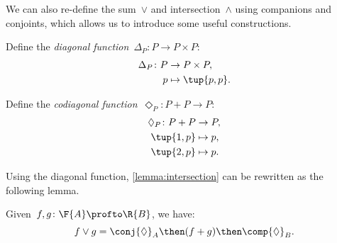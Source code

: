 We can also re-define the sum~$\vee$ and intersection~$\wedge$ using companions and conjoints, which allows us to introduce some useful constructions.

\begin{definition}
Define the \emph{diagonal function}~$\Delta_P\colon P \to P \times P$:
\begin{equation}
\begin{aligned}
    \Delta_P \colon P & \to P \times P, \\
             p & \mapsto \tup{p, p}.
\end{aligned}
\end{equation}
\end{definition}

\begin{definition}
Define the \emph{codiagonal function}~$\Diamond_P\colon P+P \to P $:
\begin{equation}
\begin{aligned}
    \Diamond_P \colon P + P & \to P,  \\
            \tup{1,p} & \mapsto p, \\
            \tup{2,p} & \mapsto p.
\end{aligned}
\end{equation}
\end{definition}

\noindent Using the diagonal function, \cref{lemma:intersection} can be rewritten as the following lemma.

\begin{lemma}
    Given~$f, g\colon \F{A} \profto \R{B}$, we have:
    \begin{equation}
        f \vee g =  \conj{\Diamond}_A \then (f + g)\then \comp{\Diamond}_B.
    \end{equation}
\end{lemma}

